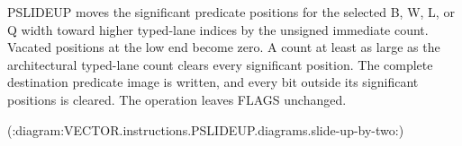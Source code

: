 PSLIDEUP moves the significant predicate positions for the selected B, W, L, or Q width toward higher typed-lane indices by the unsigned immediate count.
Vacated positions at the low end become zero.
A count at least as large as the architectural typed-lane count clears every significant position.
The complete destination predicate image is written, and every bit outside its significant positions is cleared.
The operation leaves FLAGS unchanged.

(:diagram:VECTOR.instructions.PSLIDEUP.diagrams.slide-up-by-two:)
